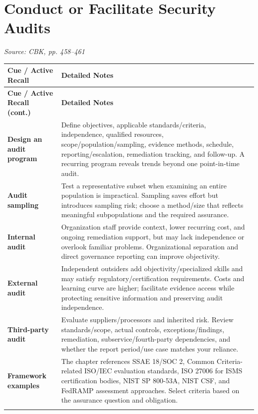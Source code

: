\documentclass[10pt,letterpaper]{article}
\makeatletter
\newenvironment{cornell}{\rowcolors{2}{white}{notebg}\begin{longtable}{@{}>{\raggedright\arraybackslash\columncolor{cuebg}\color{navy}\bfseries}p{0.285\textwidth}>{\raggedright\arraybackslash}p{0.65\textwidth}@{}}\rowcolor{navy}\color{white}\textbf{Cue / Active Recall} & \color{white}\textbf{Detailed Notes}\\ \hline\endfirsthead\rowcolor{navy}\color{white}\textbf{Cue / Active Recall (cont.)} & \color{white}\textbf{Detailed Notes}\\ \hline\endhead}{\end{longtable}}
\newcommand{\noterow}[2]{#1 & #2\\\arrayrulecolor{line}\hline}\newcommand{\source}[1]{\par{\footnotesize\color{teal}\textit{Source: CBK, #1}}\par}
\makeatother
\begin{document}
\section{\color{navy}Conduct or Facilitate Security Audits}
\source{pp. 458--461}
\begin{cornell}
\noterow{Design an audit program}{Define objectives, applicable standards/criteria, independence, qualified resources, scope/population/sampling, evidence methods, schedule, reporting/escalation, remediation tracking, and follow-up. A recurring program reveals trends beyond one point-in-time audit.}
\noterow{Audit sampling}{Test a representative subset when examining an entire population is impractical. Sampling saves effort but introduces sampling risk; choose a method/size that reflects meaningful subpopulations and the required assurance.}
\noterow{Internal audit}{Organization staff provide context, lower recurring cost, and ongoing remediation support, but may lack independence or overlook familiar problems. Organizational separation and direct governance reporting can improve objectivity.}
\noterow{External audit}{Independent outsiders add objectivity/specialized skills and may satisfy regulatory/certification requirements. Costs and learning curve are higher; facilitate evidence access while protecting sensitive information and preserving audit independence.}
\noterow{Third-party audit}{Evaluate suppliers/processors and inherited risk. Review standards/scope, actual controls, exceptions/findings, remediation, subservice/fourth-party dependencies, and whether the report period/use case matches your reliance.}
\noterow{Framework examples}{The chapter references SSAE 18/SOC 2, Common Criteria-related ISO/IEC evaluation standards, ISO 27006 for ISMS certification bodies, NIST SP 800-53A, NIST CSF, and FedRAMP assessment approaches. Select criteria based on the assurance question and obligation.}
\end{cornell}
\end{document}
